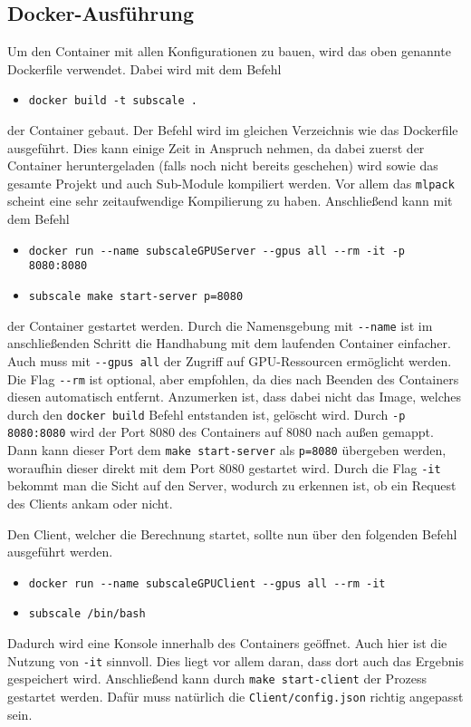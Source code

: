 \subsection{Docker-Ausführung}

Um den Container mit allen Konfigurationen zu bauen, wird das oben genannte Dockerfile verwendet. Dabei wird mit dem
Befehl
\begin{itemize}
    \item[] \verb|docker build -t subscale .|
\end{itemize}
der Container gebaut. Der Befehl wird im gleichen Verzeichnis wie das Dockerfile ausgeführt. Dies kann einige Zeit in
Anspruch nehmen, da dabei zuerst der Container heruntergeladen (falls noch nicht bereits geschehen) wird sowie das
gesamte Projekt und auch Sub-Module kompiliert werden. Vor allem das \verb|mlpack| scheint eine sehr zeitaufwendige
Kompilierung zu haben. Anschließend kann mit dem Befehl
\begin{itemize}
    \item[] \verb|docker run --name subscaleGPUServer --gpus all --rm -it -p 8080:8080|
    \item[] \verb|subscale make start-server p=8080|
\end{itemize}
der Container gestartet werden. Durch die Namensgebung mit \verb|--name| ist im anschließenden Schritt die Handhabung
mit dem laufenden Container einfacher. Auch muss mit \verb|--gpus all| der Zugriff auf GPU-Ressourcen ermöglicht werden.
Die Flag \verb|--rm| ist optional, aber empfohlen, da dies nach Beenden des Containers diesen automatisch entfernt.
Anzumerken ist, dass dabei nicht das Image, welches durch den \verb|docker build| Befehl entstanden ist, gelöscht wird.
Durch \verb|-p 8080:8080| wird der Port 8080 des Containers auf 8080 nach außen gemappt. Dann kann dieser Port dem
\verb|make start-server| als \verb|p=8080| übergeben werden, woraufhin dieser direkt mit dem Port 8080 gestartet wird.
Durch die Flag \verb|-it| bekommt man die Sicht auf den Server, wodurch zu erkennen ist, ob ein Request des Clients
ankam oder nicht.

Den Client, welcher die Berechnung startet, sollte nun über den folgenden Befehl ausgeführt werden.
\begin{itemize}
    \item[] \verb|docker run --name subscaleGPUClient --gpus all --rm -it|
    \item[] \verb|subscale /bin/bash|
\end{itemize}
Dadurch wird eine Konsole innerhalb des Containers geöffnet. Auch hier ist die Nutzung von \verb|-it| sinnvoll. Dies
liegt vor allem daran, dass dort auch das Ergebnis gespeichert wird. Anschließend kann durch \verb|make start-client|
der Prozess gestartet werden. Dafür muss natürlich die \verb|Client/config.json| richtig angepasst sein.

